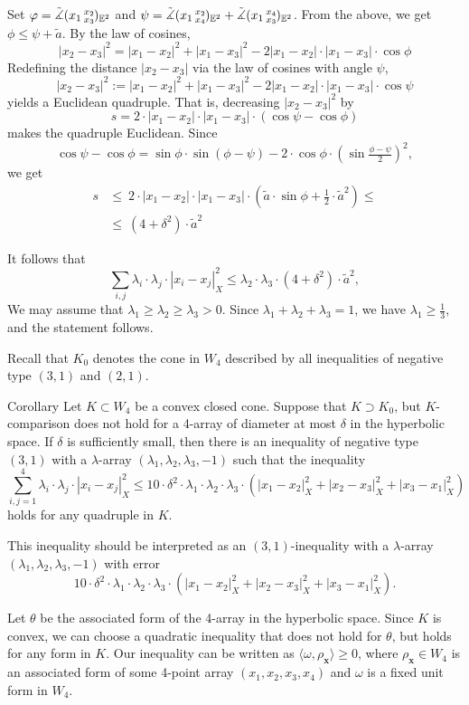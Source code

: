 \documentclass[a4paper,10pt]{article}
\begin{document}
Set $\varphi=\tilde\measuredangle(x_1\,{}^{x_2}_{x_3}\hspace{-0.2ex})_{\mathbb{E}^2}$ and $\psi=\tilde\measuredangle(x_1\,{}^{x_2}_{x_4}\hspace{-0.2ex})_{\mathbb{E}^2}+\tilde\measuredangle(x_1\,{}^{x_4}_{x_3}\hspace{-0.2ex})_{\mathbb{E}^2}$.
From the above, we get $\phi\le \psi+\tilde a$.
By the law of cosines,
\[|x_2-x_3|^2=|x_1-x_2|^2+ |x_1-x_3|^2-2|x_1-x_2|\cdot|x_1-x_3|\cdot\cos\phi\]
Redefining the distance $|x_2-x_3|$ via the law of cosines with angle $\psi$,
\[|x_2-x_3|^2\mathrel{:=}|x_1-x_2|^2+ |x_1-x_3|^2-2|x_1-x_2|\cdot|x_1-x_3|\cdot\cos\psi\]
yields a Euclidean quadruple.
That is, decreasing $|x_2-x_3|^2$ by
\[s=2\cdot |x_1-x_2|\cdot|x_1-x_3|\cdot(\cos\psi-\cos\phi)\]
makes the quadruple Euclidean.
Since
\[\cos\psi-\cos\phi=\sin\phi\cdot\sin(\phi-\psi)-2\cdot\cos\phi\cdot (\sin\tfrac{\phi-\psi}2)^2,\] we get
\begin{align*}
s
&\le\
2\cdot|x_1-x_2|\cdot|x_1-x_3|\cdot (\tilde a\cdot\sin\phi+\tfrac12\cdot\tilde a^2)
\le
\\
&\le\ (4+\delta^2)\cdot \tilde a^2
\end{align*}

It follows that
\[\sum_{i,j}\lambda_i\cdot\lambda_j\cdot|x_i-x_j|_X^2\le \lambda_2\cdot\lambda_3\cdot(4+\delta^2)\cdot \tilde a^2,\]
We may assume that $\lambda_1\ge \lambda_2\ge \lambda_3>0$.
Since $\lambda_1+ \lambda_2+ \lambda_3=1$, we have $\lambda_1\ge \tfrac13$, and the statement follows.
\qeds

Recall that $K_0$ denotes the cone in $W_4$ described by all inequalities of negative type $(3,1)$ and $(2,1)$.

\begin{thm}{Corollary}\label{cor:squared-sides}
Let $K\subset W_4$ be a convex closed cone.
Suppose that $K\supset K_0$, but $K$-comparison does not hold for a 4-array of diameter at most $\delta$ in the hyperbolic space.
If $\delta$ is sufficiently small,
then there is an inequality of negative type $(3,1)$ with a $\lambda$-array $(\lambda_1,\lambda_2,\lambda_3,-1)$ such that the inequality
\[\sum_{i,j=1}^4\lambda_i\cdot\lambda_j\cdot|x_i-x_j|_X^2
\le
10\cdot\delta^2\cdot \lambda_1\cdot\lambda_2\cdot\lambda_3\cdot (|x_1-x_2|_X^2+|x_2-x_3|_X^2+|x_3-x_1|_X^2)\]
holds for any quadruple in $K$.
\end{thm}

This inequality should be interpreted as an $(3,1)$-inequality with a $\lambda$-array $(\lambda_1,\lambda_2,\lambda_3,-1)$ with error
\[10\cdot\delta^2\cdot \lambda_1\cdot\lambda_2\cdot\lambda_3\cdot (|x_1-x_2|_X^2+|x_2-x_3|_X^2+|x_3-x_1|_X^2).\]

Let $\theta$ be the associated form of the 4-array in the hyperbolic space.
Since $K$ is convex, we can choose a quadratic inequality that does not hold for $\theta$, but holds for any form in $K$.
Our inequality can be written as $\langle \omega,\rho_{\bm{x}} \rangle\ge 0$, where $\rho_{\bm{x}}\in W_4$ is an associated form of some 4-point array $(x_1,x_2,x_3,x_4)$ and $\omega$ is a fixed unit form in $W_4$.
\end{document}

